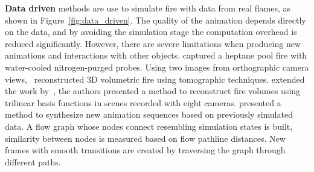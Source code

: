 \textbf{Data driven} methods are use to simulate fire with data from real flames, as shown in Figure~\ref{fig:data_driven}.
The quality of the animation depends directly on the data, and by avoiding the simulation stage the computation overhead is reduced significantly.
However, there are severe limitations when producing new animations and interactions with other objects.
\cite{Rushmeier:1995} captured a heptane pool fire with water-cooled nitrogen-purged probes.
Using two images from orthographic camera views,~\cite{Hasinoff:2003} reconstructed 3D volumetric fire using tomographic techniques.
\cite{Ihrke:2004} extended the work by~\cite{Hasinoff:2003}, the authors presented a method to reconstruct fire volumes using trilinear basis functions in scenes recorded with eight cameras.
\cite{Zhang:2011} presented a method to synthesize new animation sequences based on previously simulated data.
A flow graph whose nodes connect resembling simulation states is built, similarity between nodes is measured based on flow pathline distances.
New frames with smooth transitions are created by traversing the graph through different paths.


